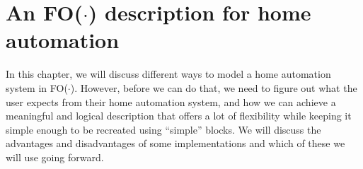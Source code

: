 \documentclass[11pt,a4paper]{report}
\newcommand{\fodot}{FO($\cdot$)\xspace}
\begin{document}
% 

\chapter{An \fodot description for home automation}
\label{home_automation_and_fodot}
In this chapter, we will discuss different ways to model a home automation system in \fodot. However, before we can do that, we need to figure out what the user expects from their home automation system, and how we can achieve a meaningful and logical description that offers a lot of flexibility while keeping it simple enough to be recreated using ``simple'' blocks. We will discuss the advantages and disadvantages of some implementations and which of these we will use going forward.
\end{document}
